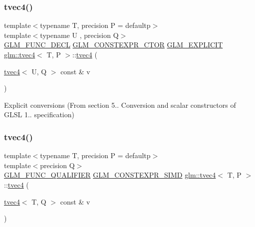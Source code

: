 \subsubsection{\texorpdfstring{tvec4()}{tvec4()}\hspace{0.1cm}{\footnotesize\ttfamily [20/35]}}
{\footnotesize\ttfamily template$<$typename T, precision P = defaultp$>$ \\
template$<$typename U , precision Q$>$ \\
\mbox{\hyperlink{setup_8hpp_ab2d052de21a70539923e9bcbf6e83a51}{G\+L\+M\+\_\+\+F\+U\+N\+C\+\_\+\+D\+E\+CL}} \mbox{\hyperlink{setup_8hpp_ad34178a09666081abdb573c14d1f4a5a}{G\+L\+M\+\_\+\+C\+O\+N\+S\+T\+E\+X\+P\+R\+\_\+\+C\+T\+OR}} \mbox{\hyperlink{setup_8hpp_a6c74f5a5e7b134ab69023ff9a30d4d5d}{G\+L\+M\+\_\+\+E\+X\+P\+L\+I\+C\+IT}} \mbox{\hyperlink{structglm_1_1tvec4}{glm\+::tvec4}}$<$ T, P $>$\+::\mbox{\hyperlink{structglm_1_1tvec4}{tvec4}} (\begin{DoxyParamCaption}\item[{\mbox{\hyperlink{structglm_1_1tvec4}{tvec4}}$<$ U, Q $>$ const \&}]{v }\end{DoxyParamCaption})}



Explicit conversions (From section 5.. Conversion and scalar constructors of G\+L\+SL 1.. specification) 

\mbox{\label{structglm_1_1tvec4_a9e9e0e3167fcd351433d379fa90c16bd}} 
\subsubsection{\texorpdfstring{tvec4()}{tvec4()}\hspace{0.1cm}{\footnotesize\ttfamily [21/35]}}
{\footnotesize\ttfamily template$<$typename T, precision P = defaultp$>$ \\
template$<$precision Q$>$ \\
\mbox{\hyperlink{setup_8hpp_a33fdea6f91c5f834105f7415e2a64407}{G\+L\+M\+\_\+\+F\+U\+N\+C\+\_\+\+Q\+U\+A\+L\+I\+F\+I\+ER}} \mbox{\hyperlink{setup_8hpp_ae5de828d10226b21e2123dd61f3cb5ed}{G\+L\+M\+\_\+\+C\+O\+N\+S\+T\+E\+X\+P\+R\+\_\+\+S\+I\+MD}} \mbox{\hyperlink{structglm_1_1tvec4}{glm\+::tvec4}}$<$ T, P $>$\+::\mbox{\hyperlink{structglm_1_1tvec4}{tvec4}} (\begin{DoxyParamCaption}\item[{\mbox{\hyperlink{structglm_1_1tvec4}{tvec4}}$<$ T, Q $>$ const \&}]{v }\end{DoxyParamCaption})}



